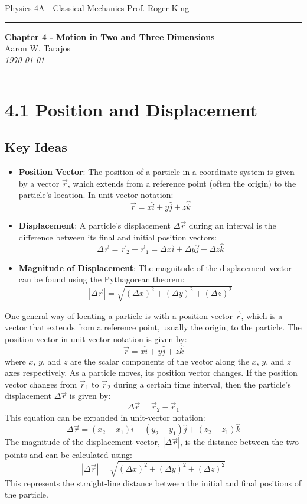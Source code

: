 \documentclass{article}
\begin{document}
\noindent
Physics 4A - Classical Mechanics \hfill Prof. Roger King

\noindent\rule{\textwidth}{0.4pt}

\begin{center}
    \textbf{\LARGE Chapter 4 - Motion in Two and Three Dimensions} \\
    \vspace{12pt}
    \large Aaron W. Tarajos \\
    \textit{\today}
\end{center}

\noindent\rule{\textwidth}{0.4pt}

\section*{4.1 Position and Displacement}
\subsection*{Key Ideas}
\begin{itemize}
    \item \textbf{Position Vector}: The position of a particle in a coordinate system is given by a vector $\vec{r}$, which extends from a reference point (often the origin) to the particle's location. In unit-vector notation:
    \[
    \vec{r} = x\hat{i} + y\hat{j} + z\hat{k}
    \]
    \item \textbf{Displacement}: A particle's displacement $\Delta \vec{r}$ during an interval is the difference between its final and initial position vectors:
    \[
    \Delta \vec{r} = \vec{r}_2 - \vec{r}_1 = \Delta x\hat{i} + \Delta y\hat{j} + \Delta z\hat{k}
    \]
    \item \textbf{Magnitude of Displacement}: The magnitude of the displacement vector can be found using the Pythagorean theorem:
    \[
    |\Delta \vec{r}| = \sqrt{(\Delta x)^2 + (\Delta y)^2 + (\Delta z)^2}
    \]
\end{itemize}
One general way of locating a particle is with a position vector $\vec{r}$, which is a vector that extends from a reference point, usually the origin, to the particle. The position vector in unit-vector notation is given by:
\[
\vec{r} = x\hat{i} + y\hat{j} + z\hat{k}
\]
where $x$, $y$, and $z$ are the scalar components of the vector along the $x$, $y$, and $z$ axes respectively.
As a particle moves, its position vector changes. If the position vector changes from $\vec{r}_1$ to $\vec{r}_2$ during a certain time interval, then the particle's displacement $\Delta \vec{r}$ is given by:
\[
\Delta \vec{r} = \vec{r}_2 - \vec{r}_1
\]
This equation can be expanded in unit-vector notation:
\[
\Delta \vec{r} = (x_2 - x_1)\hat{i} + (y_2 - y_1)\hat{j} + (z_2 - z_1)\hat{k}
\]
The magnitude of the displacement vector, $|\Delta \vec{r}|$, is the distance between the two points and can be calculated using:
\[
|\Delta \vec{r}| = \sqrt{(\Delta x)^2 + (\Delta y)^2 + (\Delta z)^2}
\]
This represents the straight-line distance between the initial and final positions of the particle.
\end{document}
